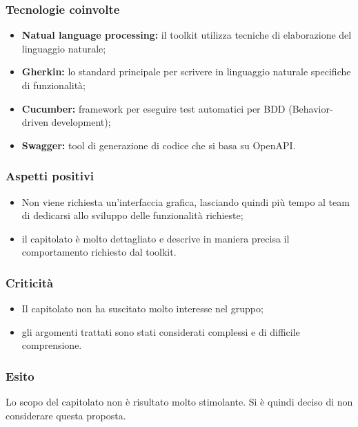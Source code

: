 \subsubsection{Tecnologie coinvolte}
	\begin{itemize}
		\item \textbf{Natual language processing:} il toolkit utilizza tecniche di elaborazione del linguaggio naturale; 
		\item \textbf{Gherkin}\textbf{:} lo standard principale per scrivere in linguaggio naturale specifiche di funzionalità; 
		\item \textbf{Cucumber}\textbf{:} framework per eseguire test automatici per BDD 
		(Behavior-driven development); 
		\item \textbf{Swagger}\textbf{:} tool di generazione di codice che si basa su OpenAPI. 
	\end{itemize}

\subsubsection{Aspetti positivi}
	\begin{itemize}
		\item Non viene richiesta un'interfaccia grafica, lasciando quindi più tempo al team di dedicarsi allo sviluppo delle funzionalità richieste; 
		\item il capitolato è molto dettagliato e descrive in maniera precisa il comportamento richiesto dal toolkit.
	\end{itemize}

\subsubsection{Criticità}
\begin{itemize}
	\item Il capitolato non ha suscitato molto interesse nel gruppo; 
	\item gli argomenti trattati sono stati considerati complessi e di difficile comprensione. 
\end{itemize}

\subsubsection{Esito}
Lo scopo del capitolato non è risultato molto stimolante. Si è quindi deciso di non considerare questa proposta. 
